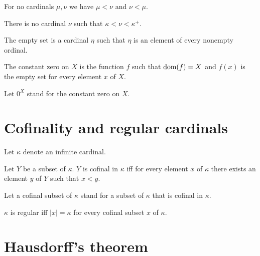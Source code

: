 \documentclass{article}
\begin{document}
\begin{forthel}
    \begin{axiom}
      For no cardinals $\mu, \nu$ we have $\mu < \nu$ and $\nu < \mu$.
    \end{axiom}

    \begin{axiom}
      There is no cardinal $\nu$ such that $\kappa < \nu < \kappa^{+}$.
    \end{axiom}

    \begin{axiom}
      The empty set is a cardinal $\eta$ such that $\eta$ is an element of
      every nonempty ordinal.
    \end{axiom}

    \begin{definition}
      The constant zero on $X$ is the function $f$ such that $\textrm{dom}(f) = X$ and
      $f(x)$ is the empty set for every element $x$ of $X$.
    \end{definition}

    Let $0^{X}$ stand for the constant zero on $X$.
  \end{forthel}


  \section{Cofinality and regular cardinals}

  \begin{forthel}
    Let $\kappa$ denote an infinite cardinal.

    \begin{definition}[Cofinality]\label{Cofinality}
      Let $Y$ be a subset of $\kappa$.
      $Y$ is cofinal in $\kappa$ iff for every element $x$ of $\kappa$ there
      exists an element $y$ of $Y$ such that $x < y$.
    \end{definition}

    Let a cofinal subset of $\kappa$ stand for a subset of $\kappa$ that is
    cofinal in $\kappa$.

    \begin{definition}
      $\kappa$ is regular iff $|x| = \kappa$ for every cofinal subset $x$ of
      $\kappa$.
    \end{definition}
  \end{forthel}


  \section{Hausdorff's theorem}
\end{document}
